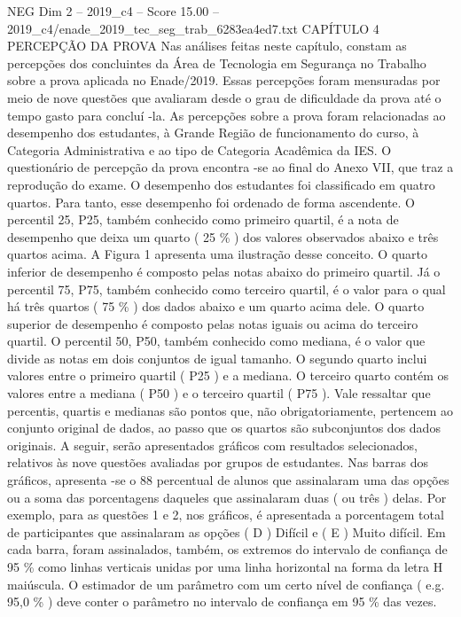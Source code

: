 \begin{textsample}{NEG Dim 2 – 2019\_c4 – Score 15.00 – 2019\_c4/enade\_2019\_tec\_seg\_trab\_6283ea4ed7.txt}  \label{ex:f2_neg_392}
CAPÍTULO 4 PERCEPÇÃO DA PROVA Nas análises feitas neste capítulo, constam as percepções dos concluintes da Área de Tecnologia em Segurança no Trabalho sobre a prova aplicada no Enade/2019.
Essas percepções foram mensuradas por meio de nove questões que avaliaram desde o grau de dificuldade da prova até o tempo gasto para concluí -la.
As percepções sobre a prova foram relacionadas ao desempenho dos estudantes, à Grande Região de funcionamento do curso, à Categoria Administrativa e ao tipo de Categoria Acadêmica da IES.
O questionário de percepção da prova encontra -se ao final do Anexo VII, que traz a reprodução do exame.
O desempenho dos estudantes foi classificado em quatro quartos.
Para tanto, esse desempenho foi ordenado de forma ascendente.
O percentil 25, P25, também conhecido como primeiro quartil, é a nota de desempenho que deixa um quarto ( 25 \% ) dos valores observados abaixo e três quartos acima.
A Figura 1 apresenta uma ilustração desse conceito.
O quarto inferior de desempenho é composto pelas notas abaixo do primeiro quartil.
Já o percentil 75, P75, também conhecido como terceiro quartil, é o valor para o qual há três quartos ( 75 \% ) dos dados abaixo e um quarto acima dele.
O quarto superior de desempenho é composto pelas notas iguais ou acima do terceiro quartil.
O percentil 50, P50, também conhecido como mediana, é o valor que divide as notas em dois conjuntos de igual tamanho.
O segundo quarto inclui valores entre o primeiro quartil ( P25 ) e a mediana.
O terceiro quarto contém os valores entre a mediana ( P50 ) e o terceiro quartil ( P75 ).
Vale ressaltar que percentis, quartis e medianas são pontos que, não obrigatoriamente, pertencem ao conjunto original de dados, ao passo que os quartos são subconjuntos dos dados originais.
A seguir, serão apresentados gráficos com resultados selecionados, relativos às nove questões avaliadas por grupos de estudantes.
Nas barras dos gráficos, apresenta -se o 88 percentual de alunos que assinalaram uma das opções ou a soma das porcentagens daqueles que assinalaram duas ( ou três ) delas.
Por exemplo, para as questões 1 e 2, nos gráficos, é apresentada a porcentagem total de participantes que assinalaram as opções ( D ) Difícil e ( E ) Muito difícil.
Em cada barra, foram assinalados, também, os extremos do intervalo de confiança de 95 \% como linhas verticais unidas por uma linha horizontal na forma da letra H maiúscula.
O estimador de um parâmetro com um certo nível de confiança ( e.g. 95,0 \% ) deve conter o parâmetro no intervalo de confiança em 95 \% das vezes.

\end{textsample}
